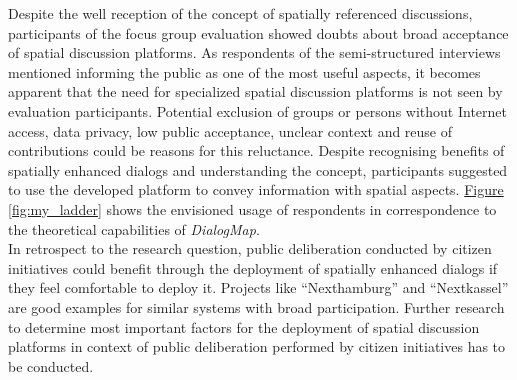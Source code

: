 Despite the well reception of the concept of spatially referenced discussions, participants of the focus group evaluation showed doubts about broad acceptance of spatial discussion platforms. As respondents of the semi-structured interviews mentioned informing the public as one of the most useful aspects, it becomes apparent that the need for specialized spatial discussion platforms is not seen by evaluation participants. Potential exclusion of groups or persons without Internet access, data privacy, low public acceptance, unclear context and reuse of contributions could be reasons for this reluctance.  Despite recognising benefits of spatially enhanced dialogs and understanding the concept, participants suggested to use the developed platform to convey information with spatial aspects. \hyperref[fig:my_ladder]{Figure \ref{fig:my_ladder}} shows the envisioned usage of respondents in correspondence to the theoretical capabilities of \textit{DialogMap}.\\
In retrospect to the research question, public deliberation conducted by citizen initiatives could benefit through the deployment of spatially enhanced dialogs if they feel comfortable to deploy it. Projects like ``Nexthamburg'' and ``Nextkassel'' are good examples for similar systems with broad participation. Further research to determine most important factors for the deployment of spatial discussion platforms in context of public deliberation performed by citizen initiatives has to be conducted.



